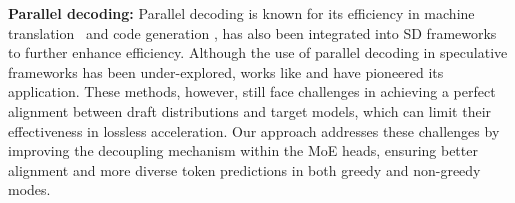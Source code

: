 {\bf Parallel decoding:}
Parallel decoding is known for its efficiency in machine translation~\cite{parallel_dec_1} and code generation \cite{meta_multitoken}, has also been integrated into SD frameworks to further enhance efficiency. Although the use of parallel decoding in speculative frameworks has been under-explored, works like \cite{monea2023pass} and \cite{yi-etal-2024-generation} have pioneered its application. These methods, however, still face challenges in achieving a perfect alignment between draft distributions and target models, which can limit their effectiveness in lossless acceleration. Our approach addresses these challenges by improving the decoupling mechanism within the MoE heads, ensuring better alignment and more diverse token predictions in both greedy and non-greedy modes.

